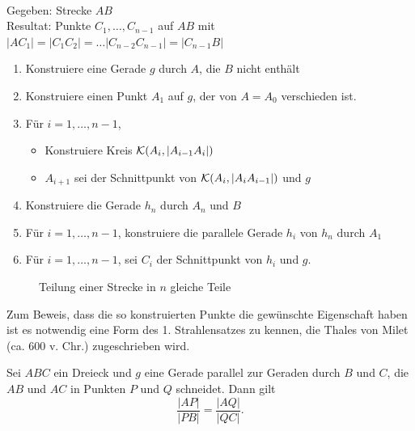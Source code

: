 \begin{konst}\ \\
    Gegeben: Strecke $AB$\\
    Resultat: Punkte $C_1, \dots, C_{n-1}$ auf $AB$ mit $|AC_1|=|C_1C_2|=\dots |C_{n-2} C_{n-1}| =
    |C_{n-1} B|$
    \renewcommand{\labelenumi}{\arabic{enumi}.} %
    \begin{enumerate}
        \item Konstruiere eine Gerade $g$ durch $A$, die $B$ nicht enthält
        \item Konstruiere einen Punkt $A_1$ auf $g$, der von $A=A_0$ verschieden ist.
        \item Für $i=1, \dots, {n-1}$,
        \begin{itemize}
            \item Konstruiere Kreis ${\mathcal K}(A_i, |A_{i-1} A_i|)$
            \item $A_{i+1}$ sei der Schnittpunkt von ${\mathcal K}(A_i, |A_{i} A_{i-1}|)$ und $g$
        \end{itemize}
        \item Konstruiere die Gerade $h_n$ durch $A_n$ und $B$
        \item Für $i=1,\dots, {n-1}$, konstruiere die parallele Gerade $h_i$ von $h_n$ durch $A_1$
        \item Für $i=1, \ldots, {n-1}$, sei $C_i$ der Schnittpunkt von $h_i$ und $g$.
    \end{enumerate}
\end{konst}

\begin{center}
    \begin{figure}[h]
        
        \caption{Teilung einer Strecke in $n$ gleiche Teile}
    \end{figure}
\end{center}

Zum Beweis, dass die so konstruierten Punkte die gewünschte Eigenschaft haben ist es notwendig eine
Form des 1. Strahlensatzes zu kennen, die Thales von Milet (ca. 600 v. Chr.) zugeschrieben wird.

\begin{thm}[Strahlensatz]\label{thm:strahlensatz}
    Sei $ABC$ ein Dreieck und $g$ eine Gerade parallel zur Geraden durch $B$ und $C$, die $AB$ und
    $AC$ in Punkten $P$ und $Q$ schneidet. Dann gilt
    $$
        \frac{|AP|}{|PB|} = \frac{|AQ|}{|QC|}.
    $$
\end{thm}

